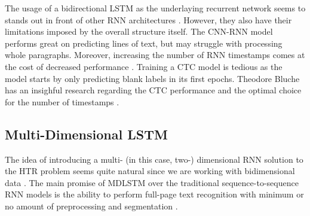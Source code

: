 The usage of a bidirectional LSTM as the underlaying recurrent network seems to stands out in front of other RNN architectures \cite{cnnbilstm}. However, they also have their limitations imposed by the overall structure itself. The CNN-RNN model performs great on predicting lines of text, but may struggle with processing whole paragraphs. Moreover, increasing the number of RNN timestamps comes at the cost of decreased performance \cite{Juan}. Training a CTC model is tedious as the model starts by only predicting blank labels in its first epochs. Theodore Bluche has an insighful research regarding the CTC performance and the optimal choice for the number of timestamps \cite{TBluche}.

\subsection{Multi-Dimensional LSTM}
\label{subsec:ch4sec1subsec3}

The idea of introducing a multi- (in this case, two-) dimensional RNN solution to the HTR problem seems quite natural since we are working with bidimensional data \cite{Juan}. The main promise of MDLSTM over the traditional sequence-to-sequence RNN models is the ability to perform full-page text recognition with minimum or no amount of preprocessing and segmentation \cite{MDLSTM}. 

\begin{figure}[htbp]
	\centering
        \begin{floatrow}
        \end{floatrow}                 
\end{figure}

